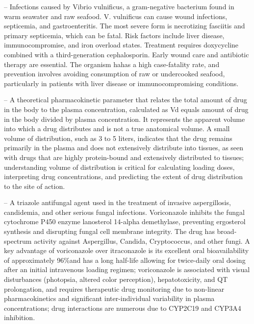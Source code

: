 -- Infections caused by Vibrio vulnificus, a gram-negative bacterium found in warm seawater and raw seafood. V. vulnificus can cause wound infections, septicemia, and gastroenteritis. The most severe form is necrotizing fasciitis and primary septicemia, which can be fatal. Risk factors include liver disease, immunocompromise, and iron overload states. Treatment requires doxycycline combined with a third-generation cephalosporin. Early wound care and antibiotic therapy are essential. The organism hahas a high case-fatality rate, and prevention involves avoiding consumption of raw or undercooked seafood, particularly in patients with liver disease or immunocompromising conditions.

-- A theoretical pharmacokinetic parameter that relates the total amount of drug in the body to the plasma concentration, calculated as Vd equals amount of drug in the body divided by plasma concentration. It represents the apparent volume into which a drug distributes and is not a true anatomical volume. A small volume of distribution, such as 3 to 5 liters, indicates that the drug remains primarily in the plasma and does not extensively distribute into tissues, as seen with drugs that are highly protein-bound and extensively distributed to tissues; understanding volume of distribution is critical for calculating loading doses, interpreting drug concentrations, and predicting the extent of drug distribution to the site of action.

-- A triazole antifungal agent used in the treatment of invasive aspergillosis, candidemia, and other serious fungal infections. Voriconazole inhibits the fungal cytochrome P450 enzyme lanosterol 14-alpha demethylase, preventing ergosterol synthesis and disrupting fungal cell membrane integrity. The drug has broad-spectrum activity against Aspergillus, Candida, Cryptococcus, and other fungi. A key advantage of voriconazole over itraconazole is its excellent oral bioavailability of approximately 96\%and has a long half-life allowing for twice-daily oral dosing after an initial intravenous loading regimen; voriconazole is associated with visual disturbances (photopsia, altered color perception), hepatotoxicity, and QT prolongation, and requires therapeutic drug monitoring due to non-linear pharmacokinetics and significant inter-individual variability in plasma concentrations; drug interactions are numerous due to CYP2C19 and CYP3A4 inhibition.

